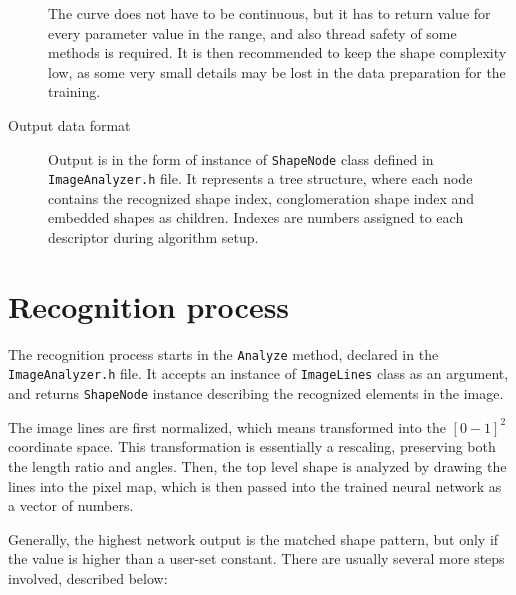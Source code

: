 \begin{description}
The curve does not have to be continuous, but it has to return value for every parameter value in the range, and also thread safety of some methods is required. It is then recommended to keep the shape complexity low, as some very small details may be lost in the data preparation for the training. 

\item [Output data format]
Output is in the form of instance of \texttt{ShapeNode} class defined in \texttt{ImageAnalyzer.h} file. It represents a tree structure, where each node contains the recognized shape index, conglomeration shape index and embedded shapes as children. Indexes are numbers assigned to each descriptor during algorithm setup.   

\end{description}

\section{Recognition process}
The recognition process starts in the \texttt{Analyze} method, declared in the \texttt{ImageAnalyzer.h} file. It accepts an instance of \texttt{ImageLines} class as an argument, and returns \texttt{ShapeNode} instance describing the recognized elements in the image.

The image lines are first normalized, which means transformed into the $[0-1]^2$ coordinate space. This transformation is essentially a rescaling, preserving both the length ratio and angles. Then, the top level shape is analyzed by drawing the lines into the pixel map, which is then passed into the trained neural network as a vector of numbers. 

Generally, the highest network output is the matched shape pattern, but only if the value is higher than a user-set constant. There are usually several more steps involved, described below:

